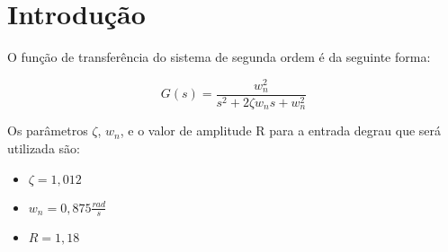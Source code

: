 \section{Introdução}

O função de transferência do sistema de segunda ordem é da seguinte forma:

\begin{equation}
\label{eq:G(s)}
G(s) = \dfrac{w_n^2}{s^2 + 2\zeta w_n s + w_n^2}
\end{equation}

Os parâmetros $\zeta$, $w_n$, e o valor de amplitude R para a entrada degrau que será utilizada são:
\begin{itemize}
    \item $\zeta = 1,012$
    \item $w_n = 0,875 \frac{rad}{s}$
    \item $R = 1,18$
\end{itemize}
